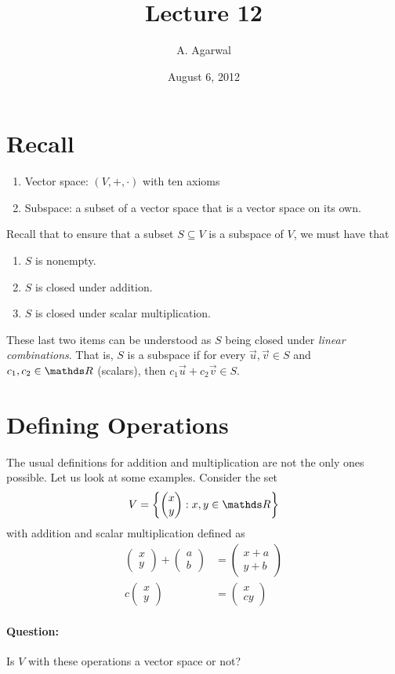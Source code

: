 \documentclass[11pt]{article}
\title{Lecture 12}
\author{A. Agarwal}
\date{August 6, 2012}
\newcommand{\ques}{\paragraph{Question:}}
\newcommand{\vek}[1]{\vec{#1}}
\begin{document}

\section*{Recall}

\begin{enumerate}
\item{
Vector space: $(V, +, \cdot)$ with ten axioms
}
\item{
Subspace: a subset of a vector space that is a vector space on its own.
}
\end{enumerate}

\vspace{1cm}

Recall that to ensure that a subset $S \subseteq V$ is a subspace of $V$, we must have that
\begin{enumerate}
\item{
$S$ is nonempty.
}
\item{
$S$ is closed under addition.
}
\item{
$S$ is closed under scalar multiplication.
}
\end{enumerate}
These last two items can be understood as $S$ being closed under \emph{linear combinations}. That is, $S$ is a subspace if for every $\vek{u}, \vek{v} \in S$ and $c_1, c_2 \in \bbR$ (scalars), then $c_1 \vek{u} + c_2 \vek{v} \in S$.

\section*{Defining Operations}
The usual definitions for addition and multiplication are not the only ones possible. Let us look at some examples. Consider the set
\begin{align*}
V = \left\{ \begin{pmatrix}x \\ y\end{pmatrix} : x,y \in \bbR \right\}
\end{align*}
with addition and scalar multiplication defined as
\begin{align*}
\begin{pmatrix}x \\ y\end{pmatrix} + \begin{pmatrix}a \\ b\end{pmatrix} &= \begin{pmatrix}x + a \\ y + b\end{pmatrix}
\\
c \begin{pmatrix}x \\ y\end{pmatrix} &= \begin{pmatrix}x \\ cy\end{pmatrix}
\end{align*}
\ques Is $V$ with these operations a vector space or not?
\end{document}
